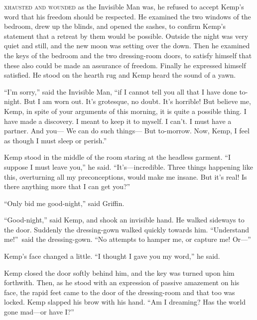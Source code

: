 \label{ch:18}
\begin{ChapterStart}
\vspace*{2\nbs}

\vspace{1.5\nbs}
\vspace{0.75\nbs}
\end{ChapterStart}

\kern-5pt\textsc{xhausted and wounded} as the Invisible Man was, he refused to accept Kemp's word that his freedom should be respected. He examined the two windows of the bedroom, drew up the blinds, and opened the sashes, to confirm Kemp's statement that a retreat by them would be possible. Outside the night was very quiet and still, and the new moon was setting over the down. Then he examined the keys of the bedroom and the two dressing-room doors, to satisfy himself that these also could be made an assurance of freedom. Finally he expressed himself satisfied. He stood on the hearth rug and Kemp heard the sound of a yawn.

“I’m sorry,” said the Invisible Man, “if I cannot tell you all that I have done to-night. But I am worn out. It’s grotesque, no doubt. It’s horrible! But believe me, Kemp, in spite of your arguments of this morning, it is quite a possible thing. I have made a discovery. I meant to keep it to myself. I can’t. I must have a partner. And you— We can do such things— But to-morrow. Now, Kemp, I feel as though I must sleep or perish.”

Kemp stood in the middle of the room staring at the headless garment. “I suppose I must leave you,” he said. “It’s—incredible. Three things happening like this, overturning all my preconceptions, would make me insane. But it’s real! Is there anything more that I can get you?”

“Only bid me good-night,” said Griffin.

“Good-night,” said Kemp, and shook an invisible hand. He walked sideways to the door. Suddenly the dressing-gown walked quickly towards him. “Understand me!”\ said the dressing-gown. “No attempts to hamper me, or capture me! Or—”

Kemp’s face changed a little. “I thought I gave you my word,” he said.

Kemp closed the door softly behind him, and the key was turned upon him forthwith. Then, as he stood with an expression of passive amazement on his face, the rapid feet came to the door of the dressing-room and that too was locked. Kemp slapped his brow with his hand. “Am I dreaming? Has the world gone mad—or have I?”

